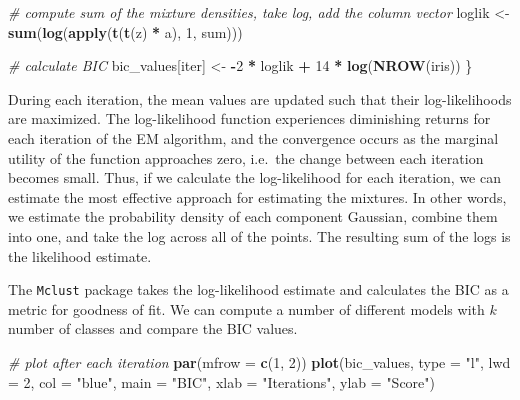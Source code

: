 \documentclass[12pt]{article}
\newenvironment{Shaded}{\begin{snugshade}}{\end{snugshade}}
\newcommand{\AttributeTok}[1]{\textcolor[rgb]{0.13,0.29,0.53}{#1}}
\newcommand{\CommentTok}[1]{\textcolor[rgb]{0.56,0.35,0.01}{\textit{#1}}}
\newcommand{\DecValTok}[1]{\textcolor[rgb]{0.00,0.00,0.81}{#1}}
\newcommand{\FunctionTok}[1]{\textcolor[rgb]{0.13,0.29,0.53}{\textbf{#1}}}
\newcommand{\NormalTok}[1]{#1}
\newcommand{\OtherTok}[1]{\textcolor[rgb]{0.56,0.35,0.01}{#1}}
\newcommand{\SpecialCharTok}[1]{\textcolor[rgb]{0.81,0.36,0.00}{\textbf{#1}}}
\newcommand{\StringTok}[1]{\textcolor[rgb]{0.31,0.60,0.02}{#1}}
\begin{document}
\begin{Shaded}
\begin{Highlighting}[]
\CommentTok{\# compute sum of the mixture densities, take log, add the column vector}
\NormalTok{loglik }\OtherTok{\textless{}{-}} \FunctionTok{sum}\NormalTok{(}\FunctionTok{log}\NormalTok{(}\FunctionTok{apply}\NormalTok{(}\FunctionTok{t}\NormalTok{(}\FunctionTok{t}\NormalTok{(z) }\SpecialCharTok{*}\NormalTok{ a), }\DecValTok{1}\NormalTok{, sum)))}

\CommentTok{\# calculate BIC}
\NormalTok{bic\_values[iter] }\OtherTok{\textless{}{-}} \SpecialCharTok{{-}}\DecValTok{2} \SpecialCharTok{*}\NormalTok{ loglik }\SpecialCharTok{+} \DecValTok{14} \SpecialCharTok{*} \FunctionTok{log}\NormalTok{(}\FunctionTok{NROW}\NormalTok{(iris))}
\NormalTok{\}}
\end{Highlighting}
\end{Shaded}

During each iteration, the mean values are updated such that their
log-likelihoods are maximized. The log-likelihood function experiences
diminishing returns for each iteration of the EM algorithm, and the
convergence occurs as the marginal utility of the function approaches
zero, i.e.~the change between each iteration becomes small. Thus, if we
calculate the log-likelihood for each iteration, we can estimate the
most effective approach for estimating the mixtures. In other words, we
estimate the probability density of each component Gaussian, combine
them into one, and take the log across all of the points. The resulting
sum of the logs is the likelihood estimate.

The \texttt{Mclust} package takes the log-likelihood estimate and
calculates the BIC as a metric for goodness of fit. We can compute a
number of different models with \(k\) number of classes and compare the
BIC values.

\begin{Shaded}
\begin{Highlighting}[]
\CommentTok{\# plot after each iteration}
\FunctionTok{par}\NormalTok{(}\AttributeTok{mfrow =} \FunctionTok{c}\NormalTok{(}\DecValTok{1}\NormalTok{, }\DecValTok{2}\NormalTok{))}
\FunctionTok{plot}\NormalTok{(bic\_values, }\AttributeTok{type =} \StringTok{"l"}\NormalTok{, }\AttributeTok{lwd =} \DecValTok{2}\NormalTok{, }\AttributeTok{col =} \StringTok{"blue"}\NormalTok{, }\AttributeTok{main =} \StringTok{"BIC"}\NormalTok{,}
     \AttributeTok{xlab =} \StringTok{"Iterations"}\NormalTok{, }\AttributeTok{ylab =} \StringTok{"Score"}\NormalTok{)}
\end{Highlighting}
\end{Shaded}
\end{document}
